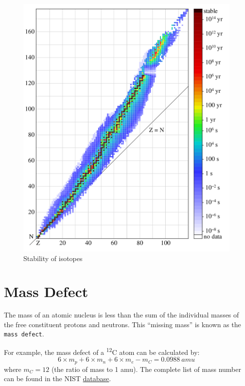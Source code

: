 \documentclass[]{book}
\theoremstyle{definition}
\theoremstyle{definition}
\theoremstyle{definition}
\theoremstyle{remark}
\begin{document}
\begin{figure}

{\centering \includegraphics[width=27.78in]{figures/isotope_halflife} 

}

\caption{Stability of isotopes}\label{fig:unnamed-chunk-3}
\end{figure}

\section{Mass Defect}\label{mass-defect}

The mass of an atomic nucleus is less than the sum of the individual
masses of the free constituent protons and neutrons. This ``missing
mass'' is known as the \texttt{mass\ defect}.

For example, the mass defect of a \textsuperscript{12}C atom can be
calculated by:
\[ 6 \times m_p + 6 \times m_n + 6 \times m_e - m_{C} = 0.0988\ amu\]
where \(m_C = 12\) (the ratio of mass to 1 amu). The complete list of
mass number can be found in the NIST
\href{https://physics.nist.gov/cgi-bin/Compositions/stand_alone.pl}{database}.
\end{document}
